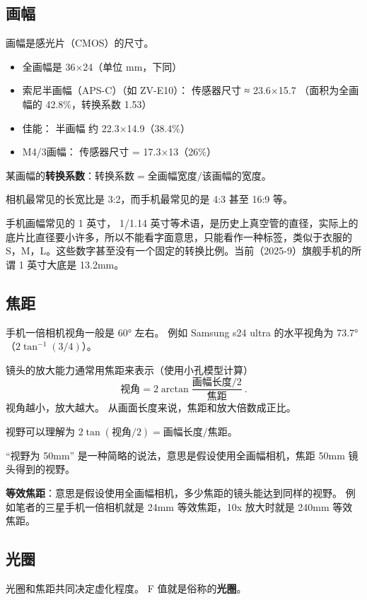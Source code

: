 
\subsection{画幅}
画幅是感光片（CMOS）的尺寸。

\begin{itemize}
\item 全画幅是 36×24（单位 mm，下同）
\item 索尼半画幅（APS-C）（如 ZV-E10）： 传感器尺寸 ≈ 23.6×15.7 （面积为全画幅的 42.8\%，转换系数 1.53）
\item 佳能： 半画幅 约 22.3×14.9（38.4\%）
\item M4/3画幅： 传感器尺寸 = 17.3×13（26\%）
\end{itemize}

某画幅的\textbf{转换系数}：$\text{转换系数} = \text{全画幅宽度}/\text{该画幅的宽度}$。

相机最常见的长宽比是 3:2，而手机最常见的是 4:3 甚至 16:9 等。

手机画幅常见的 1 英寸， 1/1.14 英寸等术语，是历史上真空管的直径，实际上的底片比直径要小许多，所以不能看字面意思，只能看作一种标签，类似于衣服的 S，M，L。这些数字甚至没有一个固定的转换比例。当前（2025-9）旗舰手机的所谓 1 英寸大底是 13.2mm。

\subsection{焦距}
手机一倍相机视角一般是 60° 左右。 例如 Samsung s24 ultra 的水平视角为 73.7°（$2\tan^{-1}(3/4)$）。

镜头的放大能力通常用焦距来表示（使用小孔模型计算）
\begin{equation}
\text{视角} = 2\arctan{\frac{\text{画幅长度/2}}{\text{焦距}}}~.
\end{equation}
视角越小，放大越大。 从画面长度来说，焦距和放大倍数成正比。

视野可以理解为 $2\tan(\text{视角}/2) = \text{画幅长度}/{\text{焦距}}$。

“视野为 50mm” 是一种简略的说法，意思是假设使用全画幅相机，焦距 50mm 镜头得到的视野。

\textbf{等效焦距}：意思是假设使用全画幅相机，多少焦距的镜头能达到同样的视野。 例如笔者的三星手机一倍相机就是 24mm 等效焦距，10x 放大时就是 240mm 等效焦距。


\subsection{光圈}
光圈和焦距共同决定虚化程度。 F 值就是俗称的\textbf{光圈}。

